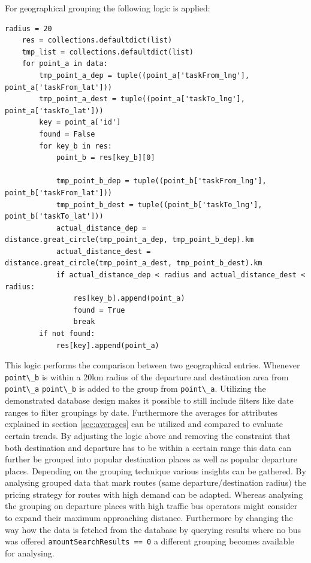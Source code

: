 For geographical grouping the following logic is applied:
\begin{lstlisting}
radius = 20
    res = collections.defaultdict(list)
    tmp_list = collections.defaultdict(list)
    for point_a in data:
        tmp_point_a_dep = tuple((point_a['taskFrom_lng'], point_a['taskFrom_lat']))
        tmp_point_a_dest = tuple((point_a['taskTo_lng'], point_a['taskTo_lat']))
        key = point_a['id']
        found = False
        for key_b in res:
            point_b = res[key_b][0]

            tmp_point_b_dep = tuple((point_b['taskFrom_lng'], point_b['taskFrom_lat']))
            tmp_point_b_dest = tuple((point_b['taskTo_lng'], point_b['taskTo_lat']))
            actual_distance_dep = distance.great_circle(tmp_point_a_dep, tmp_point_b_dep).km
            actual_distance_dest = distance.great_circle(tmp_point_a_dest, tmp_point_b_dest).km
            if actual_distance_dep < radius and actual_distance_dest < radius:
                res[key_b].append(point_a)
                found = True
                break
        if not found:
            res[key].append(point_a)
\end{lstlisting}
This logic performs the comparison between two geographical entries. Whenever \verb|point\_b| is within a 20km radius of the departure and destination area from \verb|point\_a| \verb|point\_b| is added to the group from \verb|point\_a|. Utilizing the demonstrated database design makes it possible to still include filters like date ranges to filter groupings by date. Furthermore the averages for attributes explained in section \ref{sec:averages} can be utilized and compared to evaluate certain trends. By adjusting the logic above and removing the constraint that both destination and departure has to be within a certain range this data can further be grouped into popular destination places as well as popular departure places. Depending on the grouping technique various insights can be gathered. By analysing grouped data that mark routes (same departure/destination radius) the pricing strategy for routes with high demand can be adapted. Whereas analysing the grouping on departure places with high traffic bus operators might consider to expand their maximum approaching distance. Furthermore by changing the way how the data is fetched from the database by querying results where no bus was offered \verb|amountSearchResults == 0| a different grouping becomes available for analysing. 
